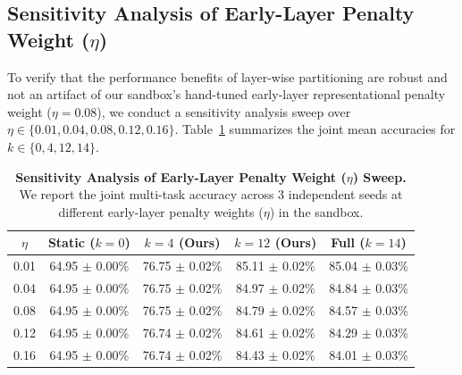 \subsection{Sensitivity Analysis of Early-Layer Penalty Weight ($\eta$)}
\label{sec:sensitivity}
To verify that the performance benefits of layer-wise partitioning are robust and not an artifact of our sandbox's hand-tuned early-layer representational penalty weight ($\eta = 0.08$), we conduct a sensitivity analysis sweep over $\eta \in \{0.01, 0.04, 0.08, 0.12, 0.16\}$. Table~\ref{tab:eta_sweep} summarizes the joint mean accuracies for $k \in \{0, 4, 12, 14\}$.

\begin{table}[h]
\caption{\textbf{Sensitivity Analysis of Early-Layer Penalty Weight ($\eta$) Sweep.} We report the joint multi-task accuracy across 3 independent seeds at different early-layer penalty weights ($\eta$) in the sandbox.}
\label{tab:eta_sweep}
\vskip 0.15in
\begin{center}
\begin{scriptsize}
\setlength{\tabcolsep}{1.2pt}
\begin{tabular}{ccccc}
\toprule
$\eta$ & Static ($k=0$) & $k=4$ (Ours) & $k=12$ (Ours) & Full ($k=14$) \\
\midrule
0.01 & 64.95 $\pm$ 0.00\% & 76.75 $\pm$ 0.02\% & 85.11 $\pm$ 0.02\% & 85.04 $\pm$ 0.03\% \\
0.04 & 64.95 $\pm$ 0.00\% & 76.75 $\pm$ 0.02\% & 84.97 $\pm$ 0.02\% & 84.84 $\pm$ 0.03\% \\
0.08 & 64.95 $\pm$ 0.00\% & 76.75 $\pm$ 0.02\% & 84.79 $\pm$ 0.02\% & 84.57 $\pm$ 0.03\% \\
0.12 & 64.95 $\pm$ 0.00\% & 76.74 $\pm$ 0.02\% & 84.61 $\pm$ 0.02\% & 84.29 $\pm$ 0.03\% \\
0.16 & 64.95 $\pm$ 0.00\% & 76.74 $\pm$ 0.02\% & 84.43 $\pm$ 0.02\% & 84.01 $\pm$ 0.03\% \\
\bottomrule
\end{tabular}
\end{scriptsize}
\end{center}
\vskip -0.1in
\end{table}

